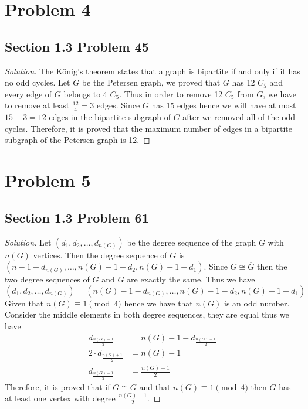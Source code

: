 \documentclass[12pt]{article}
\newenvironment*{solution}{\begin{proof}[Solution]}{\end{proof}}
\begin{document}
\section*{Problem 4}
\subsection*{Section 1.3 Problem 45}
\begin{solution}
    The Kőnig's theorem states that a graph is bipartite if and only if it has
    no odd cycles. Let \(G\) be the Petersen graph, we proved that \(G\) has
    12 \(C_5\) and every edge of \(G\) belongs to 4 \(C_5\). Thus in order to
    remove 12 \(C_5\) from \(G\), we have to remove at least \(\frac{12}{4}=3
    \) edges. Since \(G\) has 15 edges hence we will have at most \(15-3=12\)
    edges in the bipartite subgraph of \(G\) after we removed all of the odd
    cycles. Therefore, it is proved that the maximum number of edges in a
    bipartite subgraph of the Petersen graph is 12.
\end{solution}
\section*{Problem 5}
\subsection*{Section 1.3 Problem 61}
\begin{solution}
    Let \((d_1,d_2,\dots,d_{n(G)})\) be the degree sequence of the graph \(G\)
    with \(n(G)\) vertices. Then the degree sequence of \(\overline{G}\) is \(
    (n-1-d_{n(G)},\dots,n(G)-1-d_2,n(G)-1-d_1)\). Since \(G\cong\overline{G}\)
    then the two degree sequences of \(G\) and \(\overline{G}\) are exactly
    the same. Thus we have \[(d_1,d_2,\dots,d_{n(G)})=(n(G)-1-d_{n(G)},\dots,
    n(G)-1-d_2,n(G)-1-d_1)\] Given that \(n(G)\equiv1\pmod4\) hence we have
    that \(n(G)\) is an odd number. Consider the middle elements in both
    degree sequences, they are equal thus we have
    \begin{align*}
        d_{\frac{n(G)+1}{2}} &= n(G)-1-d_{\frac{n(G)+1}{2}} \\ 2\cdot
        d_{\frac{n(G)+1}{2}} &= n(G)-1 \\ d_{\frac{n(G)+1}{2}} &= 
        \frac{n(G)-1}{2}
    \end{align*}
    Therefore, it is proved that if \(G\cong\overline{G}\) and that \(n(G)
    \equiv1\pmod4\) then \(G\) has at least one vertex with degree
    \(\frac{n(G)-1}{2}\).
\end{solution}
\end{document}
